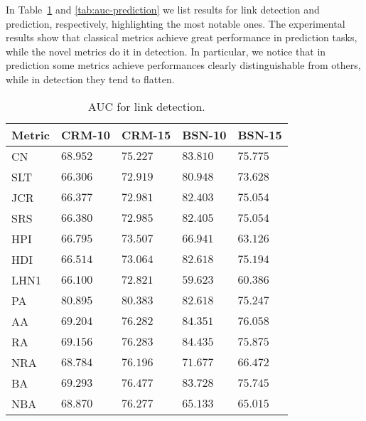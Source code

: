 In Table~\ref{tab:auc-detection} and \ref{tab:auc-prediction} we list results for link detection and prediction, respectively, highlighting the most notable ones.
%
The experimental results show that classical metrics achieve great performance in prediction tasks, while the novel metrics do it in detection.
%
In particular, we notice that in prediction some metrics achieve performances clearly distinguishable from others, while in detection they tend to flatten.

\begin{table}[h]
	\centering
	\begin{tabular}{l l l l l}
	\toprule
	\textbf{Metric} & \textbf{CRM-10} & \textbf{CRM-15} & \textbf{BSN-10} & \textbf{BSN-15}\\
	\midrule
		CN   & $68.952$ & $75.227$ & $83.810$ & $75.775$ \\
		SLT  & $66.306$ & $72.919$ & $80.948$ & $73.628$ \\
		JCR  & $66.377$ & $72.981$ & $82.403$ & $75.054$ \\
		SRS  & $66.380$ & $72.985$ & $82.405$ & $75.054$ \\
		HPI  & $66.795$ & $73.507$ & $66.941$ & $63.126$ \\
		HDI  & $66.514$ & $73.064$ & $82.618$ & $75.194$ \\
		LHN1 & $66.100$ & $72.821$ & $59.623$ & $60.386$ \\
		PA   & $80.895$ & $80.383$ & $82.618$ & $75.247$ \\
		AA   & $69.204$ & $76.282$ & $84.351$ & $76.058$ \\
		RA   & $69.156$ & $76.283$ & $84.435$ & $75.875$ \\
		NRA  & $68.784$ & $76.196$ & $71.677$ & $66.472$ \\
		BA   & $69.293$ & $76.477$ & $83.728$ & $75.745$ \\
		NBA  & $68.870$ & $76.277$ & $65.133$ & $65.015$ \\
	\bottomrule
	\end{tabular}
	\caption{AUC for link detection.}
	\label{tab:auc-detection}
\end{table}

